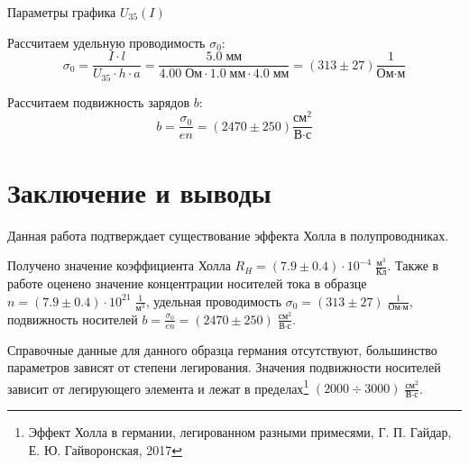 \documentclass[12pt,a4paper]{article}
\begin{document}
	\begin{table}[h]
		\caption{Параметры графика $U_{35} (I)$}
		
	\end{table}
	
	Рассчитаем удельную проводимость $\sigma_0$:
	$$ \sigma_0 = \frac{I \cdot l}{U_{35} \cdot h \cdot a} = \frac{ 5.0 \; \text{мм} }{ 4.00 \; \text{Ом} \cdot 1.0 \; \text{мм} \cdot 4.0 \; \text{мм}} = (313 \pm 27) \frac{1}{\text{Ом} \cdot \text{м}} $$
	
	Рассчитаем подвижность зарядов $b$:
	$$ b = \frac{\sigma_0}{e n} = (2470 \pm 250) \frac{\text{см}^2}{\text{В} \cdot \text{с}} $$
	
	\section*{Заключение и выводы}
	
	Данная работа подтверждает существование эффекта Холла в полупроводниках.
	
	Получено значение коэффициента Холла $ R_H = (7.9 \pm 0.4) \cdot 10^{-4} \; \frac{\text{м}^3}{\text{Кл}} $. Также в работе оценено значение концентрации носителей тока в образце $ n = (7.9 \pm 0.4) \cdot 10^{21} \; \frac{1}{\text{м}^3} $, удельная проводимость $ \sigma_0 = (313 \pm 27) \; \frac{1}{\text{Ом} \cdot \text{м}} $, подвижность носителей $ b = \frac{\sigma_0}{e n} = (2470 \pm 250) \; \frac{\text{см}^2}{\text{В} \cdot \text{с}} $.
	
	Справочные данные для данного образца германия отсутствуют, большинство параметров зависят от степени легирования. Значения подвижности носителей зависит от легирующего элемента и лежат в пределах\footnote{Эффект Холла в германии, легированном разными примесями, Г. П. Гайдар, Е. Ю. Гайворонская, 2017} $(2000 \div 3000) \; \frac{\text{см}^2}{\text{В} \cdot \text{с}}$.
	
\end{document}

